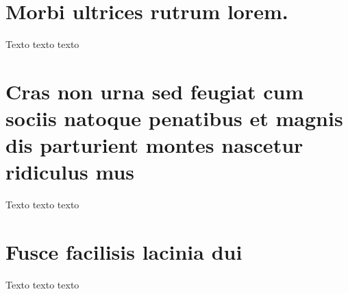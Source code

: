 \begin{anexosenv}


\partanexos

\chapter{Morbi ultrices rutrum lorem.}
Texto texto texto

\chapter{Cras non urna sed feugiat cum sociis natoque penatibus et magnis dis
parturient montes nascetur ridiculus mus}

Texto texto texto

\chapter{Fusce facilisis lacinia dui}

Texto texto texto


\end{anexosenv}
